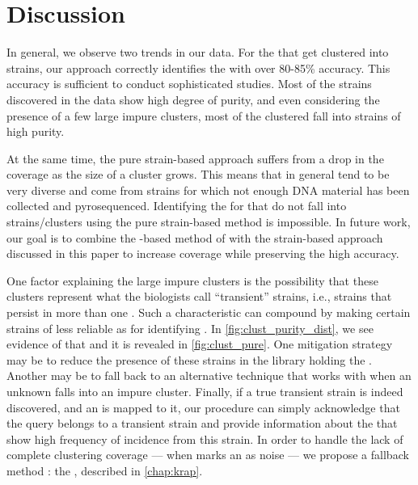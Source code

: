 \section{Discussion}\label{sec:discussion:clustering}

In general, we observe two trends in our data. For the \isols{} that get clustered into strains,
our approach correctly identifies the \spec{} with over 80-85\% accuracy. This accuracy
is sufficient to conduct sophisticated \mst{} studies. Most of the strains discovered 
in the \cplop{} data show high degree of purity, and even considering the presence of 
a few large impure clusters, most of the clustered \isols{} fall into strains of high purity.


At the same time, the pure strain-based approach suffers from a drop in the coverage as the size of a cluster grows. 
This means that in general \cplop{} \isols{} tend to be very diverse
and come from strains for which not enough DNA material has been collected and pyrosequenced.
Identifying the \spec{} for \isols{} that do not fall into strains/clusters using the pure strain-based
method is impossible. In future work, our goal is to combine the \kNN{}-based \mst{} method
of \cite{DBLP:conf/bibm/McGovernDKBVG15} with the strain-based approach discussed in this paper
to increase coverage while preserving the high \mst{} accuracy.







One factor explaining the large impure clusters is the possibility that these clusters represent what the  biologists call  ``transient'' strains, i.e., strains that  persist in more than one \spec{}. 
Such a characteristic can compound \mst{} by making certain strains of \ecoli{} less reliable as \fib{} for identifying \spec{}.
In \autoref{fig:clust_purity_dist}, we see evidence of that and it is revealed in \autoref{fig:clust_pure}.
One mitigation strategy may be to reduce the presence of these strains in the library holding the \fib{}.
Another may be to fall back to an alternative \mst{} technique that works with \cplop{} when an unknown \isol{} falls into an impure cluster.
Finally, if a true transient strain is indeed discovered, and an \isol{} is mapped to it, our \mst{} procedure can simply acknowledge that the query \isol{} belongs to a transient strain and provide information about the \spec{} that show high frequency of \ecoli{} incidence from this strain.
In order to handle the lack of complete clustering coverage --- when \dbscan{} marks an \isol{} as noise --- we propose a fallback method : the \kraplong{}, described in \autoref{chap:krap}.


